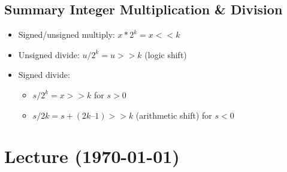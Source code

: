 \documentclass[a4paper,10pt]{article}
\begin{document}
\subsection{Summary Integer Multiplication \& Division}
\begin{itemize}
    \item Signed/unsigned multiply: $x * 2^k= x<<k$
    \item Unsigned divide: $u/2^k=u>>k$ (logic shift)
    \item Signed divide:
    \begin{itemize}
        \item $s/2^k=x>>k$ for $s>0$
        \item $s / 2k = s + (2k – 1) >> k$ (arithmetic shift) for $s < 0 $ 
    \end{itemize}
\end{itemize}
\pagebreak
\section{Lecture (\today)}
\end{document}
